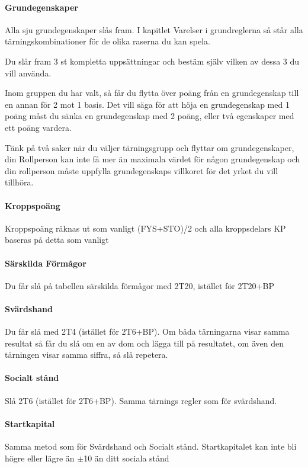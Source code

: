 \documentclass[a4paper, 10pt, titlepage]{article}
\begin{document}
\paragraph{Grundegenskaper} Alla sju grundegenskaper slås fram. I kapitlet Varelser i grundreglerna så står
alla tärningskombinationer för de olika raserna du kan spela.

Du slår fram 3 st kompletta uppsättningar och bestäm själv vilken av dessa 3 du vill använda.

Inom gruppen du har valt, så får du flytta över poäng från en grundegenskap till en annan för 2 mot 1
basis. Det vill säga för att höja en grundegenskap med 1 poäng måst du sänka en grundegenskap med 2 poäng,
eller två egenskaper med ett poäng vardera.

Tänk på två saker när du väljer tärningsgrupp och flyttar om grundegenskaper, din Rollperson kan inte få
mer än maximala värdet för någon grundegenskap och din rollperson måste uppfylla grundegenskaps villkoret
för det yrket du vill tillhöra.

\paragraph{Kroppspoäng} Kroppspoäng räknas ut som vanligt (FYS+STO)/2 och alla kroppsdelars KP baseras på
detta som vanligt

\paragraph{Särskilda Förmågor} Du får slå på tabellen särskilda förmågor med 2T20, istället för 2T20+BP

\paragraph{Svärdshand} Du får slå med 2T4 (istället för 2T6+BP). Om båda tärningarna visar samma resultat
så får du slå om en av dom och lägga till på resultatet, om även den tärningen visar samma siffra, så
slå repetera.

\paragraph{Socialt stånd} Slå 2T6 (istället för 2T6+BP). Samma tärnings regler som för svärdshand.

\paragraph{Startkapital} Samma metod som för Svärdshand och Socialt stånd. Startkapitalet kan inte
bli högre eller lägre än $\pm$10 än ditt sociala stånd
\end{document}
